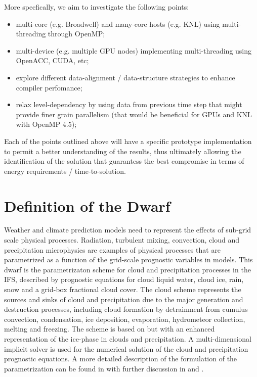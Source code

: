 \documentclass[
a4paper,     %
12pt,        %
article,
onecolumn,   %
openany,     %
]{memoir}
\begin{document}
More specfically, we aim to investigate the following points:
%
\begin{itemize}
\item multi-core (e.g. Broadwell) and many-core hosts (e.g. KNL) using 
multi-threading through OpenMP;
\item multi-device (e.g. multiple GPU nodes) implementing multi-threading 
using OpenACC, CUDA, etc;
\item explore different data-alignment / data-structure strategies 
to enhance compiler perfomance;
\item relax level-dependency by using data from previous time step 
that might provide finer grain parallelism (that would be beneficial 
for GPUs and KNL with OpenMP 4.5);
\end{itemize}
%
Each of the points outlined above will have a specific prototype 
implementation to permit a better understanding of the results, 
thus ultimately allowing the identification of the solution that 
guarantess the best compromise in terms of energy requirements 
/ time-to-solution.




\section{Definition of the Dwarf}
Weather and climate prediction models need to represent the effects of 
sub-grid scale physical processes. Radiation, turbulent 
mixing, convection, cloud and precipitation microphysics are 
examples of physical processes that are parametrized as a function 
of the grid-scale prognostic variables in models. This dwarf 
is the parametrizaton scheme for cloud and precipitation processes 
in the IFS, described by prognostic equations for cloud liquid water, 
cloud ice, rain, snow and a grid-box fractional cloud cover. The cloud 
scheme represents the sources and sinks of cloud and precipitation due 
to the major generation and destruction processes, including cloud formation 
by detrainment from cumulus convection, condensation, ice deposition, evaporation, 
hydrometeor collection, melting and freezing. The scheme is based on \cite{Tiedtke1993} 
but with an enhanced representation of the ice-phase in clouds and precipitation. 
A multi-dimensional implicit solver is used for the numerical solution of 
the cloud and precipitation prognostic equations.  A more detailed description 
of the formulation of the parametrization can be found in \cite{IFSdoc} with 
further discussion in \cite{ForbesandTompkins2011} and \cite{Forbesetal2011}.
\end{document}

